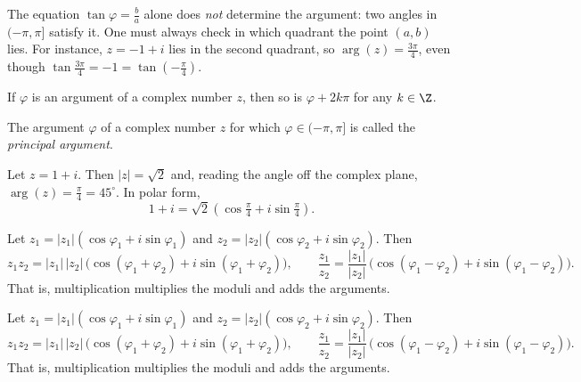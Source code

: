 \begin{warning}
The equation $\tan\varphi= \tfrac{b}{a}$ alone does \emph{not} determine the argument: two angles in
$(-\pi,\pi]$ satisfy it. One must always check in which quadrant the point $(a,b)$ lies. For instance,
$z=-1+i$ lies in the second quadrant, so $\arg(z)=\tfrac{3\pi}{4}$, even though
$\tan \tfrac{3\pi}{4} = -1 = \tan\!\left(-\tfrac{\pi}{4}\right)$.
\end{warning}

\begin{fact}
If $\varphi$ is an argument of a complex number $z$, then so is $\varphi+2k\pi$ for any $k\in\Z$.
\end{fact}

\begin{definition}
The argument $\varphi$ of a complex number $z$ for which $\varphi\in (-\pi,\pi]$ is called the
\emph{principal argument}.
\end{definition}

\begin{example}
Let $z=1+i$. Then $|z|=\sqrt{2}$ and, reading the angle off the complex plane, $\arg(z) = \tfrac{\pi}{4}=45^\circ$.
In polar form,
\[
1+i = \sqrt{2}\left( \cos\tfrac{\pi}{4} + i \sin \tfrac{\pi}{4}\right).
\]
\end{example}

\begin{theorem}
Let $z_1=|z_1|(\cos \varphi_1 + i\sin\varphi_1)$ and $z_2=|z_2|(\cos \varphi_2 + i\sin\varphi_2)$. Then
\[
z_1 z_2 = |z_1|\,|z_2|\,\big(\cos (\varphi_1+\varphi_2) + i\sin(\varphi_1+\varphi_2)\big), \qquad
\frac{z_1}{z_2} = \frac{|z_1|}{|z_2|}\,\big(\cos (\varphi_1-\varphi_2) + i\sin(\varphi_1-\varphi_2)\big).
\]
That is, multiplication multiplies the moduli and adds the arguments.
\end{theorem}

\begin{theorem}
Let $z_1=|z_1|(\cos \varphi_1 + i\sin\varphi_1)$ and $z_2=|z_2|(\cos \varphi_2 + i\sin\varphi_2)$. Then
\[
z_1 z_2 = |z_1|\,|z_2|\,\big(\cos (\varphi_1+\varphi_2) + i\sin(\varphi_1+\varphi_2)\big), \qquad
\frac{z_1}{z_2} = \frac{|z_1|}{|z_2|}\,\big(\cos (\varphi_1-\varphi_2) + i\sin(\varphi_1-\varphi_2)\big).
\]
That is, multiplication multiplies the moduli and adds the arguments.
\end{theorem}

